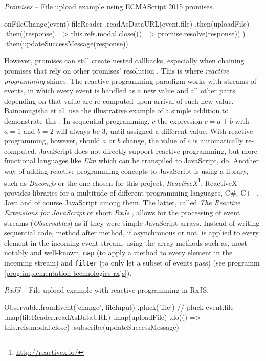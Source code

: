 \begin{program}
\caption{\emph{Promises} -- File upload example using ECMAScript 2015 promises.}
\label{prog:implementation-technologies-rxjs-promises}
\begin{JsCode}
onFileChange(event) {
  fileReader
    .readAsDataURL(event.file)
    .then(uploadFile)
    .then((response) => {
      this.refs.modal.close(() => promise.resolve(response))
    })
    .then(updateSuccessMessage(response))
}
\end{JsCode}
\end{program}

\noindent However, promises can still create nested callbacks, especially when chaining promises that rely on other promises' resolution \cite{reactive-vs-promises}. This is where \emph{reactive programming} shines: The reactive programming paradigm works with streams of events, in which every event is handled as a new value and all other parts depending on that value are re-computed upon arrival of such new value. Bainomugisha et al. use the illustrative example of a simple addition to demonstrate this \cite{reactive-programming-survey}: In sequential programming, $c$ the expression $c = a + b$ with $a = 1$ and $b = 2$ will always be $3$, until assigned a different value. With reactive programming, however, should $a$ or $b$ change, the value of $c$ is automatically re-computed.
JavaScript does not directly support reactive programming, but more functional languages like \emph{Elm} \cite{elm} which can be transpiled to JavaScript, do. Another way of adding reactive programming concepts to JavaScript is using a library, such as \emph{Bacon.js} \cite{baconjs} or the one chosen for this project, \emph{ReactiveX}\footnote{\url{http://reactivex.io/}}. ReactiveX provides libraries for a multitude of different programming languages, C\#, C++, Java and of course JavaScript among them. The latter, called \emph{The Reactive Extensions for JavaScript} or short \emph{RxJs} \cite{rxjs}, allows for the processing of event streams (\emph{Observables}) as if they were simple JavaScript arrays. Instead of writing sequential code, method after method, if asynchronous or not, is applied to every element in the incoming event stream, using the array-methods such as, most notably and well-known, \texttt{map} (to apply a method to every element in the incoming stream) and \texttt{filter} (to only let a subset of events pass) (see programm \ref{prog:implementation-technologies-rxjs}).

\begin{program}
\caption{\emph{RxJS} -- File upload example with reactive programming in RxJS.}
\label{prog:implementation-technologies-rxjs}
\begin{JsCode}
Observable.fromEvent('change', fileInput)
  .pluck('file') // pluck event.file
  .map(fileReader.readAsDataURL)
  .map(uploadFile)
  .do(() => this.refs.modal.close)
  .subscribe(updateSuccessMessage)
\end{JsCode}
\end{program}

